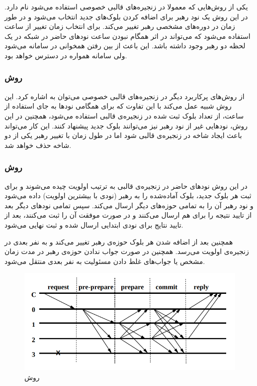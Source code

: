  یکی از روش‌هایی که معمولا در زنجیره‌های قالبی خصوصی استفاده می‌شود 
 \cite{Aura}
 نام دارد. در این روش یک نود رهبر برای اضافه کردن بلوک‌های جدید انتخاب می‌شود و در طور زمان در دوره‌های مشخصی رهبر تغییر می‌کند. برای انتخاب زمان تغییر از ساعت  استفاده می‌شود که می‌تواند در اثر همگام
 نبودن ساعت نود‌های حاضر در شبکه در یک لحظه دو رهبر وجود داشته باشد. این باعث از بین رفتن همخوانی در سامانه می‌شود ولی سامانه همواره در دسترس خواهد بود. 
\subsubsection{روش }
از روش‌های پرکاربرد دیگر در زنجیره‌های قالبی خصوصی می‌توان به 
 \cite{Clique}
 اشاره کرد. این روش شبیه  عمل می‌کند با این تفاوت که برای همگامی نودها به جای استفاده از ساعت، از تعداد بلوک ثبت شده در زنجیره‌ی قالبی استفاده می‌شود، همچنین در این روش، نود‌هایی غیر از نود رهبر نیز می‌توانند بلوک جدید پیشنهاد کنند. این کار می‌تواند باعث ایجاد شاخه‌ در زنجیره‌ی قالبی شود اما در طول زمان با تغییر رهبر یکی از دو شاخه حذف خواهد شد. 
 
 
 \subsubsection{روش }
 
 در این روش 
  \cite{PBFT}
 نود‌های حاضر در زنجیره‌ی قالبی به ترتیب اولویت چیده می‌شوند و برای ثبت هر بلوک جدید، بلوک آماده‌شده را به رهبر (نود‌ی با بیشترین اولویت) داده می‌شود و نود رهبر آن‌ را به تمامی حوزه‌های دیگر ارسال می‌کند. سپس تمامی نودهای دیگر بعد از تایید نتیجه را برای هم ارسال می‌کنند و در صورت موفقت آن را ثبت می‌کنند، بعد از تایید نتایج برای نود‌ی ابتدایی ارسال شده و ثبت نهایی می‌شود.
 \par
 همچنین بعد از اضافه شدن هر بلوک حوزه‌ی رهبر تغییر می‌کند و به نفر بعدی در زنجیره‌ی اولویت می‌رسد. همچنین در صورت جواب ندادن حوزه‌ی رهبر در مدت زمان مشخص یا جواب‌های غلط دادن مسئولیت به نفر بعدی منتقل می‌شود. 
 
 \begin{figure}[h!]
 	\centering
 	\includegraphics[width=1\linewidth]{PBFT.png}
 	\caption {روش }
 	\label{fig:PBFT}
 \end{figure}
 
